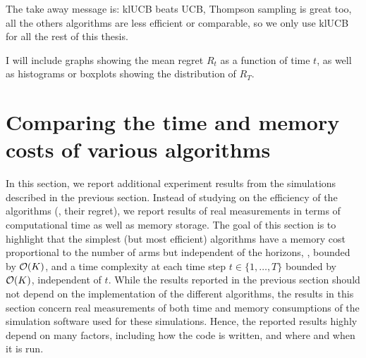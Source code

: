 The take away message is: klUCB beats UCB, Thompson sampling is great too, all the others algorithms are less efficient or comparable, so we only use klUCB for all the rest of this thesis.

I will include graphs showing the mean regret $R_t$ as a function of time $t$, as well as histograms or boxplots showing the distribution of $R_T$.


\section{Comparing the time and memory costs of various algorithms}
\label{sec:3:timeAndMemoryCosts}


In this section, we report additional experiment results from the simulations described in the previous section.
Instead of studying on the efficiency of the algorithms (\ie, their regret), we report results of real measurements in terms of computational time as well as memory storage.
%
The goal of this section is to highlight that the simplest (but most efficient) algorithms have a memory cost proportional to the number of arms but independent of the horizons, \ie, bounded by $\mathop{}\mathopen{}\mathcal{O}\mathopen{}\left(K\right)$, and a time complexity at each time step $t\in\{1,\dots,T\}$ bounded by $\mathop{}\mathopen{}\mathcal{O}\mathopen{}\left(K\right)$, independent of $t$.
%
While the results reported in the previous section should not depend on the implementation of the different algorithms, the results in this section concern real measurements of both time and memory consumptions of the simulation software used for these simulations.
Hence, the reported results highly depend on many factors, including how the code is written, and where and when it is run.


